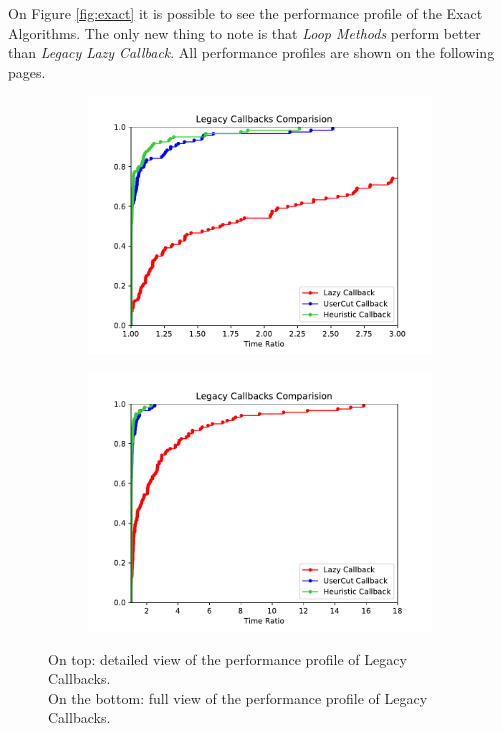 On Figure \ref{fig:exact} it is possible to see the performance profile of the Exact Algorithms. The only new thing to note is that \textit{Loop Methods} perform better than \textit{Legacy Lazy Callback}.
All performance profiles are shown on the following pages.

\begin{figure}[h!]
  \centering
  \begin{subfigure}[b]{0.97\linewidth}
    \includegraphics[width=\linewidth]{media/LegacyCallbacks.pdf}
  \end{subfigure}
  \begin{subfigure}[b]{0.97\linewidth}
  \ContinuedFloat
    \includegraphics[width=\linewidth]{media/LegacyCallbacks1.pdf}
  \end{subfigure}
  \caption{On top: detailed view of the performance profile of Legacy Callbacks. \\On the bottom: full view of the performance profile of Legacy Callbacks.}
\label{fig:lazy}
\end{figure}

